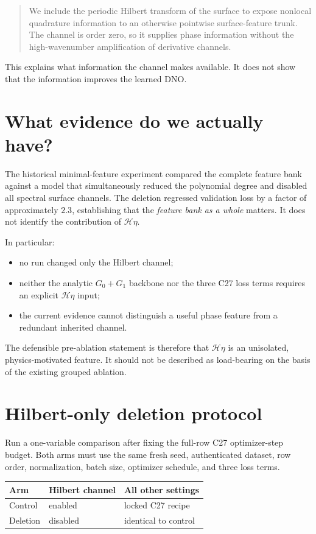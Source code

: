 \documentclass[11pt]{article}
\newcommand{\Hil}{\mathcal{H}}
\begin{document}
\begin{quote}
We include the periodic Hilbert transform of the surface to expose nonlocal
quadrature information to an otherwise pointwise surface-feature trunk.  The
channel is order zero, so it supplies phase information without the
high-wavenumber amplification of derivative channels.
\end{quote}

This explains what information the channel makes available.  It does not show
that the information improves the learned DNO.

\section{What evidence do we actually have?}

The historical minimal-feature experiment compared the complete feature bank
against a model that simultaneously reduced the polynomial degree and disabled
all spectral surface channels.  The deletion regressed validation loss by a
factor of approximately $2.3$, establishing that the \emph{feature bank as a
whole} matters.  It does not identify the contribution of $\Hil\eta$.

In particular:
\begin{itemize}
  \item no run changed only the Hilbert channel;
  \item neither the analytic $G_0+G_1$ backbone nor the three C27 loss terms
        requires an explicit $\Hil\eta$ input;
  \item the current evidence cannot distinguish a useful phase feature from a
        redundant inherited channel.
\end{itemize}

The defensible pre-ablation statement is therefore that $\Hil\eta$ is an
unisolated, physics-motivated feature.  It should not be described as
load-bearing on the basis of the existing grouped ablation.

\section{Hilbert-only deletion protocol}

Run a one-variable comparison after fixing the full-row C27 optimizer-step
budget.  Both arms must use the same fresh seed, authenticated dataset, row
order, normalization, batch size, optimizer schedule, and three loss terms.

\begin{center}
\begin{tabular}{lll}
\toprule
Arm & Hilbert channel & All other settings \\
\midrule
Control & enabled & locked C27 recipe \\
Deletion & disabled & identical to control \\
\bottomrule
\end{tabular}
\end{center}
\end{document}
